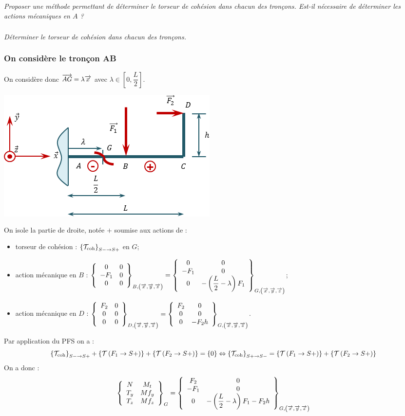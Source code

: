\documentclass[10pt,fleqn]{article} %
\begin{document}
\begin{multicols}{1}
\subparagraph{}
\textit{Proposer une méthode permettant de déterminer le torseur de cohésion dans chacun des tronçons. Est-il nécessaire de déterminer les actions mécaniques en $A$ ?}

\subparagraph{}
\textit{Déterminer le torseur de cohésion dans chacun des tronçons.}


\ifprof
\begin{corrige}
\subsubsection*{On considère le tronçon AB}
On considère donc $\vect{AG} = \lambda \vect{x}$ avec $\lambda\in \left[0,\dfrac{L}{2}\right]$.
\begin{center}
\includegraphics[width=.45\textwidth]{images/exo_08_corr_01}
\end{center}


On isole la partie de droite, notée $+$ soumise aux actions de :
\begin{itemize}[label=,font=\color{ocre}] 
\item torseur de cohésion : $\torseurscoh_{S-\rightarrow S+}$ en $G$;
\item action mécanique en $B$ : $\torseurcol{0}{-F_1}{0}{0}{0}{0}{B,\left( \vect{x},\vect{y},\vect{z} \right)}  =\torseurcol{0}{-F_1}{0}{0}{0}{-\left(\dfrac{L}{2}-\lambda \right)F_1}{G,\left( \vect{x},\vect{y},\vect{z} \right)} $;
\item action mécanique en $D$ : $\torseurcol{F_2}{0}{0}{0}{0}{0}{D,\left( \vect{x},\vect{y},\vect{z} \right)}  =\torseurcol{F_2}{0}{0}{0}{0}{-F_2h}{G,\left( \vect{x},\vect{y},\vect{z} \right)} $.
\end{itemize}


Par application du PFS on a : 
$$ \torseurscoh_{S-\rightarrow S+} +\torseurstat{T}{F_1}{S+} +\torseurstat{T}{F_2}{S+} = \{0\} \Leftrightarrow \torseurscoh_{S+\rightarrow S-} =\torseurstat{T}{F_1}{S+} +\torseurstat{T}{F_2}{S+}  $$
On a donc  :
$$
\torseurcol{N}{T_y}{T_z}{M_t}{Mf_y}{Mf_z}{G} = 
\torseurcol{F_2}{-F_1}{0}{0}{0}{-\left(\dfrac{L}{2}-\lambda \right)F_1-F_2h}{G,\left( \vect{x},\vect{y},\vect{z} \right)}
$$


\end{corrige}
\end{multicols}
\end{document}
